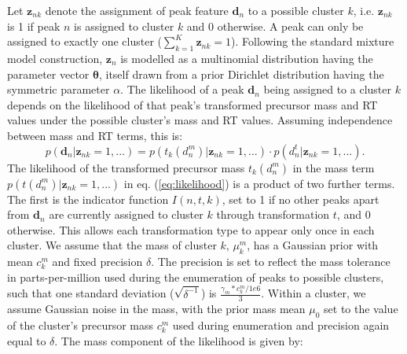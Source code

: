 Let $\boldsymbol{z}_{nk}$ denote the assignment of peak feature $\textbf{d}_n$ to a possible cluster $k$, i.e. $\boldsymbol{z}_{nk}$ is 1 if peak $n$ is assigned to cluster $k$ and 0 otherwise. A peak can only be assigned to exactly one cluster ($\sum_{k=1}^{K} \boldsymbol{z}_{nk}=1$). Following the standard mixture model construction, $\boldsymbol{z}_{n}$ is modelled as a multinomial distribution having the parameter vector $\boldsymbol{\theta}$, itself drawn from a prior Dirichlet distribution having the symmetric parameter $\alpha$. The likelihood of a peak $\textbf{d}_n$ being assigned to a cluster $k$ depends on the likelihood of that peak's transformed precursor mass and RT values under the possible cluster's mass and RT values. Assuming independence between mass and RT terms, this is:
\begin{equation}\label{eq:likelihood}
p(\boldsymbol{d}_n\vert\boldsymbol{z}_{nk}=1,...)=p(t_k(d_n^m)\vert\boldsymbol{z}_{nk}=1,...) \cdot p(d_n^t\vert\boldsymbol{z}_{nk}=1,...).
\end{equation}
The likelihood of the transformed precursor mass $t_k(d_n^m)$ in the mass term $p(t(d_n^m)\vert\boldsymbol{z}_{nk}=1,...)$ in eq. (\ref{eq:likelihood}) is a product of two further terms. The first is the indicator function $I(n,t, k)$, set to 1 if no other peaks apart from $\textbf{d}_n$ are currently assigned to cluster $k$ through transformation $t$, and 0 otherwise. This allows each transformation type to appear only once in each cluster. We assume that the mass of cluster $k$, $\mu_k^m$, has a Gaussian prior with mean $c_k^m$ and fixed precision $\delta$. The precision is set to reflect the mass tolerance in parts-per-million used during the enumeration of peaks to possible clusters, such that one standard deviation ($\sqrt{\delta^{-1}}$) is $\frac{\gamma_m*c_k^m/1e6}{3}$. Within a cluster, we assume Gaussian noise in the mass, with the prior mass mean $\mu_0$ set to the value of the cluster's precursor mass $c_k^m$ used during enumeration and precision again equal to $\delta$. The mass component of the likelihood is given by:
